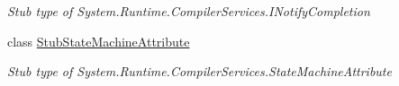 \begin{DoxyCompactItemize}
\begin{DoxyCompactList}\small\item\em Stub type of System.\-Runtime.\-Compiler\-Services.\-I\-Notify\-Completion\end{DoxyCompactList}\item 
class \hyperlink{class_system_1_1_runtime_1_1_compiler_services_1_1_fakes_1_1_stub_state_machine_attribute}{Stub\-State\-Machine\-Attribute}
\begin{DoxyCompactList}\small\item\em Stub type of System.\-Runtime.\-Compiler\-Services.\-State\-Machine\-Attribute\end{DoxyCompactList}\end{DoxyCompactItemize}
